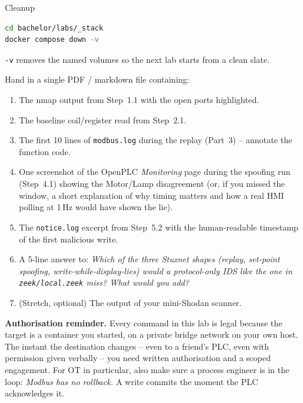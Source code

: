 \documentclass[11pt,a4paper]{article}
\begin{document}
\begin{stepbox}{Cleanup}
\begin{lstlisting}[language=bash]
cd bachelor/labs/_stack
docker compose down -v
\end{lstlisting}
\texttt{-v} removes the named volumes so the next lab starts from a
clean slate.
\end{stepbox}

\begin{deliverbox}
Hand in a single PDF / markdown file containing:
\begin{enumerate}\setlength{\itemsep}{1pt}
  \item The nmap output from Step~1.1 with the open ports highlighted.
  \item The baseline coil/register read from Step~2.1.
  \item The first 10 lines of \texttt{modbus.log} during the replay
        (Part~3) -- annotate the function code.
  \item One screenshot of the OpenPLC \emph{Monitoring} page during
        the spoofing run (Step~4.1) showing the
        Motor/Lamp disagreement (or, if you missed the window, a
        short explanation of why timing matters and how a real HMI
        polling at 1\,Hz would have shown the lie).
  \item The \texttt{notice.log} excerpt from Step~5.2 with the
        human-readable timestamp of the first malicious write.
  \item A 5-line answer to: \emph{Which of the three Stuxnet shapes
        (replay, set-point spoofing, write-while-display-lies) would
        a protocol-only IDS like the one in
        \texttt{zeek/local.zeek} miss? What would you add?}
  \item (Stretch, optional) The output of your mini-Shodan scanner.
\end{enumerate}
\end{deliverbox}

\begin{warnbox}
\textbf{Authorisation reminder.} Every command in this lab is legal
because the target is a container you started, on a private bridge
network on your own host. The instant the destination changes --
even to a friend's PLC, even with permission given verbally --
you need written authorisation and a scoped engagement. For OT in
particular, also make sure a process engineer is in the loop:
\emph{Modbus has no rollback.} A write commits the moment the PLC
acknowledges it.
\end{warnbox}
\end{document}
